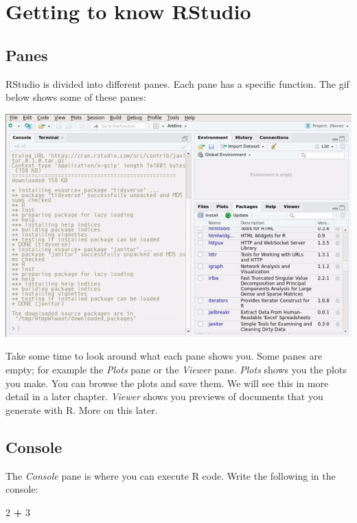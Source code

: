 \documentclass[]{gitbook}
\newenvironment{Shaded}{\begin{snugshade}}{\end{snugshade}}
\newcommand{\DecValTok}[1]{\textcolor[rgb]{0.00,0.00,0.81}{#1}}
\newcommand{\OperatorTok}[1]{\textcolor[rgb]{0.81,0.36,0.00}{\textbf{#1}}}
\newcommand{\StringTok}[1]{\textcolor[rgb]{0.31,0.60,0.02}{#1}}
\theoremstyle{definition}
\theoremstyle{definition}
\theoremstyle{definition}
\theoremstyle{remark}
\begin{document}
\hypertarget{getting-to-know-rstudio}{%
\section{Getting to know RStudio}\label{getting-to-know-rstudio}}

\hypertarget{panes}{%
\subsection{Panes}\label{panes}}

RStudio is divided into different panes. Each pane has a specific
function. The gif below shows some of these panes:

\includegraphics{pics/rstudio_panes.gif}

Take some time to look around what each pane shows you. Some panes are
empty; for example the \emph{Plots} pane or the \emph{Viewer} pane.
\emph{Plots} shows you the plots you make. You can browse the plots and
save them. We will see this in more detail in a later chapter.
\emph{Viewer} shows you previews of documents that you generate with R.
More on this later.

\hypertarget{console}{%
\subsection{Console}\label{console}}

The \emph{Console} pane is where you can execute R code. Write the
following in the console:

\begin{Shaded}
\begin{Highlighting}[]
\DecValTok{2} \OperatorTok{+}\StringTok{ }\DecValTok{3}
\end{Highlighting}
\end{Shaded}
\end{document}
